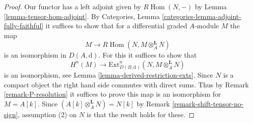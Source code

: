 \documentclass[10pt,a4paper]{amsart}
\theoremstyle{plain}
\theoremstyle{definition}
\theoremstyle{remark}
\numberwithin{equation}{subsection}
\def\Hom{\mathop{\mathrm{Hom}}\nolimits}
\begin{document}
\begin{proof}
Our functor has a left adjoint given by
$R\Hom(N, -)$ by Lemma \ref{lemma-tensor-hom-adjoint}.
By Categories, Lemma \ref{categories-lemma-adjoint-fully-faithful}
it suffices to show that for a differential graded $A$-module $M$
the map
$$
M \longrightarrow R\Hom(N, M \otimes_A^\mathbf{L} N)
$$
is an isomorphism in $D(A, \text{d})$. For this it suffices to show that
$$
H^n(M) \longrightarrow
\text{Ext}^n_{D(B, \text{d})}(N, M \otimes_A^\mathbf{L} N)
$$
is an isomorphism, see Lemma \ref{lemma-derived-restriction-exts}.
Since $N$ is a compact object the right hand side commutes
with direct sums. Thus by Remark \ref{remark-P-resolution}
it suffices to prove this map is an isomorphism for $M = A[k]$.
Since $(A[k] \otimes_A^\mathbf{L} N) = N[k]$ by
Remark \ref{remark-shift-tensor-no-sign},
assumption (2) on $N$ is that the result holds for these.
\end{proof}
\end{document}

